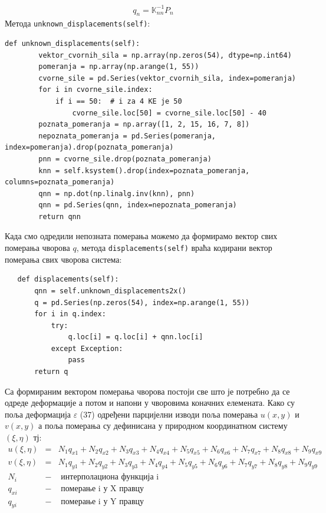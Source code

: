 \documentclass[11pt, a4paper]{article}
\begin{document}
\begin{eqnarray}
q_{n} = \mathbb{K}_{nn} ^ {-1} P_{n}
\end{eqnarray} 
Метода \texttt{unknown\_displacements(self)}:
\begin{lstlisting}
def unknown_displacements(self):
        vektor_cvornih_sila = np.array(np.zeros(54), dtype=np.int64)  
        pomeranja = np.array(np.arange(1, 55))  
        cvorne_sile = pd.Series(vektor_cvornih_sila, index=pomeranja)
        for i in cvorne_sile.index:
            if i == 50:  # i za 4 KE je 50
                cvorne_sile.loc[50] = cvorne_sile.loc[50] - 40
        poznata_pomeranja = np.array([1, 2, 15, 16, 7, 8])  
        nepoznata_pomeranja = pd.Series(pomeranja, index=pomeranja).drop(poznata_pomeranja)
        pnn = cvorne_sile.drop(poznata_pomeranja)
        knn = self.ksystem().drop(index=poznata_pomeranja, columns=poznata_pomeranja)
        qnn = np.dot(np.linalg.inv(knn), pnn)
        qnn = pd.Series(qnn, index=nepoznata_pomeranja)
        return qnn
\end{lstlisting}
Када смо одредили непозната померања можемо да формирамо вектор свих померања чворова $q$, метода \texttt{displacements(self)} враћа кодирани вектор померања свих чворова система:
\begin{lstlisting}
   def displacements(self):
       qnn = self.unknown_displacements2x()
       q = pd.Series(np.zeros(54), index=np.arange(1, 55))  
       for i in q.index:
           try:
               q.loc[i] = q.loc[i] + qnn.loc[i]
           except Exception:
               pass
       return q
\end{lstlisting}
Са формираним вектором померања чворова постоји све што је потребно да се одреде деформације а потом и напони у чворовима коначних елемената. Како су поља деформација $\varepsilon$ (37) одређени парцијелни изводи поља померања $u(x,y)$ и $v(x,y)$ а поља померања су дефинисана у природном координатном систему $(\xi, \eta)$ тј:
\begin{eqnarray*}
u(\xi, \eta) &=& N_1 q_{x1} + N_2q_{x2} + N_3q_{x3} + N_4q_{x4} + N_5q_{x5} + N_6q_{x6} + N_7q_{x7} + N_8q_{x8} + N_9q_{x9} \\
v(\xi, \eta) &=& N_1 q_{y1} + N_2q_{y2} + N_3q_{y3} + N_4q_{y4} + N_5q_{y5} + N_6q_{y6} + N_7q_{y7} + N_8q_{y8} + N_9q_{y9}\\
N_i &-& \text{ интерполациона функција i}\\
q_{xi} &-& \text{ померање i у X правцу}\\
q_{yi} &-& \text{ померање i у Y правцу}
\end{eqnarray*} 
\end{document}
